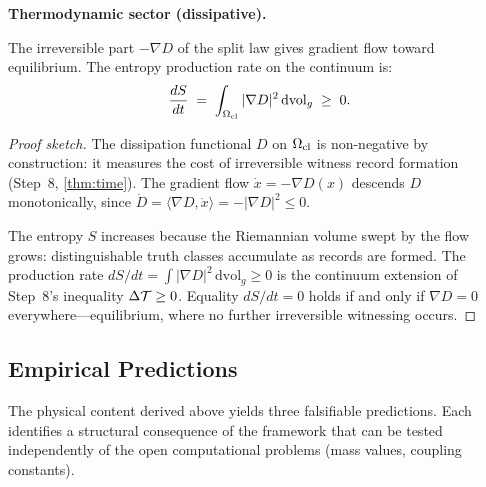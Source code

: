 \bigskip
\noindent\textbf{Thermodynamic sector (dissipative).}

\begin{theorem}
\label{thm:second-law}
The irreversible part $-\nabla D$ of the split law gives gradient flow
toward equilibrium.  The entropy production rate on the continuum is:
\[
  \frac{dS}{dt} \;=\; \int_{\Omega_{\mathrm{cl}}} |\nabla D|^2\, \mathrm{dvol}_g
  \;\geq\; 0.
\]
\begin{proof}[Proof sketch]
The dissipation functional $D$ on $\Omega_{\mathrm{cl}}$ is non-negative by
construction: it measures the cost of irreversible witness record formation
(Step~8, \cref{thm:time}).  The gradient flow $\dot{x} = -\nabla D(x)$
descends $D$ monotonically, since
$\dot{D} = \langle \nabla D, \dot{x} \rangle = -|\nabla D|^2 \leq 0$.

The entropy $S$ increases because the Riemannian volume swept by the flow
grows: distinguishable truth classes accumulate as records are formed.
The production rate $dS/dt = \int |\nabla D|^2\, \mathrm{dvol}_g \geq 0$
is the continuum extension of Step~8's inequality $\Delta\mathcal{T} \geq 0$.
Equality $dS/dt = 0$ holds if and only if $\nabla D = 0$
everywhere---equilibrium, where no further irreversible witnessing occurs.

\end{proof}
\end{theorem}

\subsection{Empirical Predictions}
\label{sec:physics:predictions}

The physical content derived above yields three falsifiable predictions.
Each identifies a structural consequence of the framework that can be tested
independently of the open computational problems (mass values, coupling
constants).

